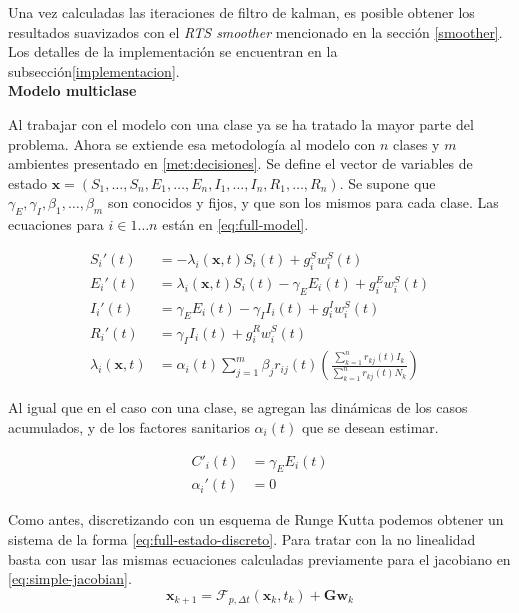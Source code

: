Una vez calculadas las iteraciones de filtro de kalman, es posible obtener los resultados suavizados con el \textit{RTS smoother} mencionado en la sección \ref{smoother}. Los detalles de la implementación se encuentran en la subsección\ref{implementacion}.\\



\noindent \textbf{Modelo multiclase}

Al trabajar con el modelo con una clase ya se ha tratado la mayor parte del problema. Ahora se extiende esa metodología al modelo con \(n\) clases y \(m\) ambientes presentado en \ref{met:decisiones}. Se define el vector de variables de estado \(\mathbf{x} = (S_1, \dots, S_n, E_1, \dots, E_n, I_1, \dots, I_n, R_1, \dots, R_n)\). Se supone que \(\gamma_E, \gamma_I, \beta_1, \dots, \beta_m\) son conocidos y fijos, y que son los mismos para cada clase. Las ecuaciones para \(i \in 1\dots n\) están en \ref{eq:full-model}.


\begin{subequations}\label{eq:full-model}
\begin{align}
S_i'(t) &= -\lambda_i(\mathbf{x}, t) S_i(t) + g^S_i w^S_i(t)\\
E_i'(t) &= \lambda_i(\mathbf{x}, t) S_i(t) - \gamma_E E_i(t) + g^E_i w^S_i(t) \nonumber\\
I_i'(t) &= \gamma_E E_i(t) - \gamma_{I} I_i(t) + g^I_i w^S_i(t)\nonumber \\
R_i'(t) &= \gamma_{I} I_i(t) + g^R_i w^S_i(t) \nonumber \\
\lambda_i(\mathbf{x}, t) &= \alpha_i(t)\sum_{j=1}^m \beta_{j}r_{ij}(t)\left(\frac{\sum_{k=1}^{n}r_{kj}(t) I_k}{\sum_{k=1}^{n}r_{kj}(t)N_k}\right) \label{eq:full-lambda}
\end{align}
\end{subequations}



Al igual que en el caso con una clase, se agregan las dinámicas de los casos acumulados, y de los factores sanitarios \(\alpha_i(t)\) que se desean estimar.
\begin{subequation}
\begin{align}
C'_i(t) &= \gamma_E E_i(t) \\
\alpha_i'(t) &= 0
\end{align}
\end{subequation}




Como antes, discretizando con un esquema de Runge Kutta podemos obtener un sistema de la forma \ref{eq:full-estado-discreto}. Para tratar con la no linealidad basta con usar las mismas ecuaciones calculadas previamente para el jacobiano en \ref{eq:simple-jacobian}. 
\begin{equation} \label{eq:full-estado-discreto}
\mathbf{x}_{k+1} = \mathcal{F}_{p, \Delta t}(\mathbf{x}_k, t_k) +  \mathbf{G}\mathbf{w}_{k} 
\end{equation}

